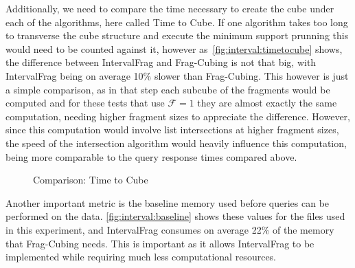 Additionally, we need to compare the time necessary to create the cube under each of the algorithms, here called Time to Cube.
If one algorithm takes too long to transverse the cube structure and execute the minimum support prunning this would need to be counted against it, however as~\autoref{fig:interval:timetocube} shows, the difference between IntervalFrag and Frag-Cubing is not that big, with IntervalFrag being on average 10\% slower than Frag-Cubing.
This however is just a simple comparison, as in that step each subcube of the fragments would be computed and for these tests that use $\mathcal{F} = 1$ they are almost exactly the same computation, needing higher fragment sizes to appreciate the difference.
However, since this computation would involve list intersections at higher fragment sizes, the speed of the intersection algorithm would heavily influence this computation, being more comparable to the query response times compared above.

\begin{figure}[H]
  \caption{Comparison: Time to Cube}\label{fig:interval:timetocube}
  \vspace{6mm}
  \begin{center}
  \end{center}
  \vspace{2mm}
\end{figure}

Another important metric is the baseline memory used before queries can be performed on the data.
\autoref{fig:interval:baseline} shows these values for the files used in this experiment, and IntervalFrag consumes on average 22\% of the memory that Frag-Cubing needs.
This is important as it allows IntervalFrag to be implemented while requiring much less computational resources.

